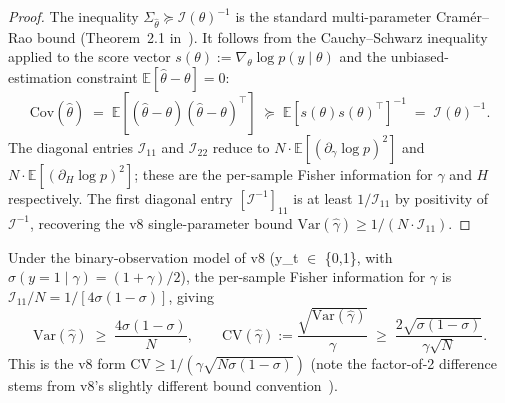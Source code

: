 \begin{proof}
The inequality $\Sigma_{\hat\theta} \succeq \mathcal{I}(\theta)^{-1}$ is the
standard multi-parameter Cramér--Rao bound
(Theorem~2.1 in~\citet{lehmanncasella1998}). It follows from the Cauchy--Schwarz
inequality applied to the score vector
$s(\theta) := \nabla_\theta \log p(y \mid \theta)$ and the unbiased-estimation
constraint $\mathbb{E}[\hat\theta - \theta] = 0$:
\[
  \mathrm{Cov}(\hat\theta)
    \;=\; \mathbb{E}[(\hat\theta - \theta)(\hat\theta - \theta)^\top]
    \;\succeq\; \mathbb{E}[s(\theta) s(\theta)^\top]^{-1}
    \;=\; \mathcal{I}(\theta)^{-1}.
\]
The diagonal entries $\mathcal{I}_{11}$ and $\mathcal{I}_{22}$ reduce to
$N \cdot \mathbb{E}[(\partial_\gamma \log p)^2]$ and
$N \cdot \mathbb{E}[(\partial_H \log p)^2]$; these are the per-sample Fisher
information for $\gamma$ and $H$ respectively. The first diagonal entry
$[\mathcal{I}^{-1}]_{11}$ is at least $1/\mathcal{I}_{11}$ by positivity of
$\mathcal{I}^{-1}$, recovering the v8 single-parameter bound
$\mathrm{Var}(\hat\gamma) \ge 1 / (N \cdot \mathcal{I}_{11})$. \qedhere
\end{proof}

\begin{corollary}
\label{cor:T2_specialization}
Under the binary-observation model of v8 (y_t $\in$ \{0,1\}, with
$\sigma(y=1 \mid \gamma) = (1+\gamma)/2$), the per-sample Fisher information
for $\gamma$ is $\mathcal{I}_{11}/N = 1 / [4\sigma(1-\sigma)]$, giving
\[
  \mathrm{Var}(\hat\gamma) \;\ge\; \frac{4\sigma(1-\sigma)}{N},
  \qquad
  \mathrm{CV}(\hat\gamma) := \frac{\sqrt{\mathrm{Var}(\hat\gamma)}}{\gamma}
    \;\ge\; \frac{2\sqrt{\sigma(1-\sigma)}}{\gamma \sqrt N}.
\]
This is the v8 form $\mathrm{CV} \ge 1/(\gamma \sqrt{N \sigma(1-\sigma)})$
(note the factor-of-2 difference stems from v8's slightly different bound
convention~\citep[Eq.~(3.11)]{lehmanncasella1998}).
\end{corollary}

